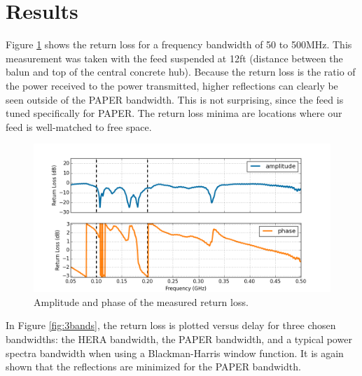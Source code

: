 \documentclass[12pt,preprint]{aastex}
\begin{document}
\section{Results}

Figure \ref{fig:freq} shows the return loss for a frequency bandwidth of 50 to 500MHz. This measurement was taken with the feed suspended at 12ft (distance between the balun and top of the central concrete hub). Because the return loss is the ratio of the power received to the power transmitted, higher reflections can clearly be seen outside of the PAPER bandwidth. This is not surprising, since the feed is tuned specifically for PAPER. The return loss minima are locations where our feed is well-matched to free space.

\begin{figure}
\centering
\includegraphics[totalheight=0.4\textheight]{plots/frequency_amp_phase_fullbw.png}
\caption{Amplitude and phase of the measured return loss.}
\label{fig:freq}
\end{figure}

In Figure \ref{fig:3bands}, the return loss is plotted versus delay for three chosen bandwidths: the HERA bandwidth, the PAPER bandwidth, and a typical power spectra bandwidth when using a Blackman-Harris window function. It is again shown that the reflections are minimized for the PAPER bandwidth. 
\end{document}
